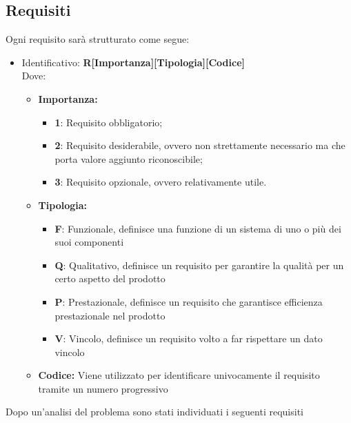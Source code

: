 \subsection{Requisiti}
Ogni requisito sarà strutturato come segue:
\begin{itemize}
	\item Identificativo: \textbf{R[Importanza][Tipologia][Codice]}\\
	Dove:
	\begin{itemize}
		\item \textbf{Importanza:}
		\begin{itemize}
			\item \textbf{1}: Requisito obbligatorio;
			\item \textbf{2}: Requisito desiderabile, ovvero non strettamente necessario ma che porta valore aggiunto riconoscibile;
			\item \textbf{3}: Requisito opzionale, ovvero relativamente utile.
		\end{itemize}
		\item \textbf{Tipologia:}
		\begin{itemize}
			\item \textbf{F}: Funzionale, definisce una funzione di un sistema di uno o più dei suoi componenti
			\item \textbf{Q}: Qualitativo, definisce un requisito per garantire la qualità per un certo aspetto del prodotto
			\item \textbf{P}: Prestazionale, definisce un requisito che garantisce efficienza prestazionale nel prodotto
			\item \textbf{V}: Vincolo, definisce un requisito volto a far rispettare un dato vincolo
		\end{itemize}
		\item \textbf{Codice:} Viene utilizzato per identificare univocamente il requisito tramite un numero progressivo\\
	\end{itemize}
\end{itemize}
Dopo un’analisi del problema sono stati individuati i seguenti requisiti
